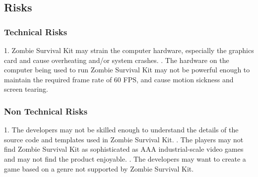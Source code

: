 \documentclass[12pt, titlepage]{article}
\begin{document}




\subsection{Risks}

\subsubsection{Technical Risks}
1. Zombie Survival Kit may strain the computer hardware, especially the graphics card and cause overheating and/or system crashes.
. The hardware on the computer being used to run Zombie Survival Kit may not be powerful enough to maintain the required frame rate of 60 FPS, and cause motion sickness and screen tearing.

\subsubsection{Non Technical Risks}
1. The developers may not be skilled enough to understand the details of the source code and templates used in Zombie Survival Kit.
. The players may not find Zombie Survival Kit as sophisticated as AAA industrial-scale video games and may not find the product enjoyable.
. The developers may want to create a game based on a genre not supported by Zombie Survival Kit.

\end{document}
